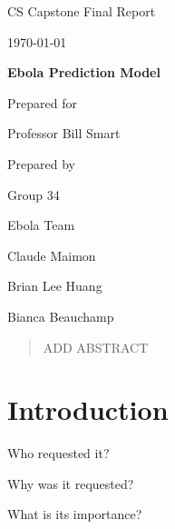 \documentclass[onecolumn, draftclsnofoot,10pt, compsoc]{IEEEtran}
\def \CapstoneTeamName{		Ebola Team}
\def \CapstoneTeamNumber{		34}
\def \GroupMemberOne{			Claude Maimon}
\def \GroupMemberTwo{			Brian Lee Huang}
\def \GroupMemberThree{			Bianca Beauchamp}
\def \CapstoneProjectName{		Ebola Prediction Model}
\def \CapstoneSponsorCompany{	Professor Bill Smart}
\def \DocType{		Final Report
}
\newcommand{\NameSigPair}[1]{\par
	\makebox[2.75in][r]{#1} \hfil 	\makebox[3.25in]{\makebox[2.25in]{\hrulefill} \hfill		\makebox[.75in]{\hrulefill}}
	\par\vspace{-12pt} \textit{\tiny\noindent
		\makebox[2.75in]{} \hfil		\makebox[3.25in]{\makebox[2.25in][r]{Signature} \hfill	\makebox[.75in][r]{Date}}}}
\renewcommand{\NameSigPair}[1]{#1}
\begin{document}
	\begin{titlepage}
		\begin{singlespace}
			\hfill 
			\par\vspace{.2in}
			\centering
			\scshape{
				\huge CS Capstone \DocType \par
				{\large\today}\par
				\vspace{.5in}
				\textbf{\Huge\CapstoneProjectName}\par
				\vfill
				{\large Prepared for}\par
				\Huge \CapstoneSponsorCompany\par
				\vspace{5pt}
				{\large Prepared by }\par
				Group\CapstoneTeamNumber\par
				\CapstoneTeamName\par 
				\vspace{5pt}
				{\Large
					\NameSigPair{\GroupMemberOne}\par
					\NameSigPair{\GroupMemberTwo}\par
					\NameSigPair{\GroupMemberThree}\par
				}
				\vspace{20pt}
			}
			\begin{abstract}
				ADD ABSTRACT	
			\end{abstract}  
		   
		\end{singlespace}
	\end{titlepage}

	\newpage
	\tableofcontents
	\clearpage
	
	\section{Introduction}
	
	Who requested it?
	
	Why was it requested?
	
	What is its importance?
	
\end{document}
